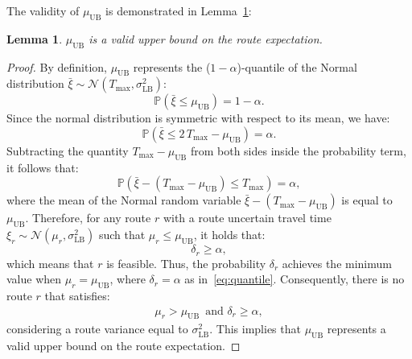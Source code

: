 \documentclass[11pt]{article}
\newtheorem{lemma}[theorem]{Lemma}
\theoremstyle{definition}
\begin{document}
%
The validity of $\mu_{\text{UB}}$ is demonstrated in Lemma~\ref{lem:lemma6}:
%
\begin{lemma}
\label{lem:lemma6}
$\mu_{\text{UB}}$ is a valid upper bound on the route expectation.
\end{lemma}

\begin{proof}
By definition, $\mu_{\text{UB}}$ represents the (${1-\alpha}$)-quantile of the Normal distribution $\bar{\xi} \sim \mathcal{N}(T_{\max}, \sigma^2_{\text{LB}})$:
%
\[
\mathbb{P}(\bar{\xi} \leq \mu_{\text{UB}}) = 1 - \alpha.
\]
%
Since the normal distribution is symmetric with respect to its mean, we have:
%
\[
\mathbb{P}(\bar{\xi} \leq 2 \, T_{\max} - \mu_{\text{UB}}) = \alpha.
\]
%
Subtracting the quantity $T_{\max} - \mu_{\text{UB}}$ from both sides inside the probability term, it follows that:
\begin{equation}
\label{eq:quantile}
\mathbb{P}(\bar{\xi} - (T_{\max} - \mu_{\text{UB}}) \leq T_{\max}) = \alpha,
\end{equation}
where the mean of the Normal random variable $\bar{\xi} - (T_{\max} - \mu_{\text{UB}})$ is equal to $\mu_{\text{UB}}$.
Therefore, for any route $r$ with a route uncertain travel time $\xi_r \sim \mathcal{N}(\mu_r, \sigma^2_{\text{LB}})$ such that $\mu_r \leq \mu_{\text{UB}}$, it holds that:
%
\[
\delta_r \geq \alpha,
\]
%
which means that $r$ is feasible.
%
Thus, the probability $\delta_r$ achieves the minimum value when $\mu_r = \mu_{\text{UB}}$, where $\delta_r = \alpha$ as in~\eqref{eq:quantile}. Consequently, there is no route $r$ that satisfies:
%
\begin{align*}
\mu_r > \mu_{\text{UB}} \, \text{ and } \delta_r \geq \alpha,
\end{align*}
%
considering a route variance equal to $\sigma^2_{\text{LB}}$. This implies that $\mu_{\text{UB}}$ represents a valid upper bound on the route expectation.
\end{proof}
\end{document}
